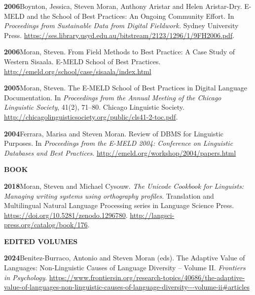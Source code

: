 \documentclass[11pt]{article}
\newcommand{\hangpara}{
 \setlength{\parindent}{0in} %
 \hangindent=0.42in %
}
\begin{document}
\vskip 6pt
\hangpara
{\bf 2006}\hspace{1ex}Boynton, Jessica, Steven Moran, Anthony Aristar and Helen Aristar-Dry. E-MELD and the School of Best Practices: An Ongoing Community Effort. In {\it Proceedings from Sustainable Data from Digital Fieldwork.} Sydney University Press. \url{https://ses.library.usyd.edu.au/bitstream/2123/1296/1/9FH2006.pdf}. %

\vskip 6pt
\hangpara
{\bf 2006}\hspace{1ex}Moran, Steven. From Field Methods to Best Practice: A Case Study of Western Sisaala. E-MELD School of Best Practices. \url{http://emeld.org/school/case/sisaala/index.html}

\vskip 6pt
\hangpara
{\bf 2005}\hspace{1ex}Moran, Steven. The E-MELD School of Best Practices in Digital Language Documentation. In {\it Proceedings from the Annual Meeting of the Chicago Linguistic Society}, 41(2), 71--80. Chicago Linguistic Society. \url{http://chicagolinguisticsociety.org/public/cls41-2-toc.pdf}.


\vskip 6pt
\hangpara
{\bf 2004}\hspace{1ex}Ferrara, Marisa and Steven Moran. Review of DBMS for Linguistic Purposes. In {\it Proceedings from the E-MELD 2004: Conference on Linguistic Databases and Best Practices}. \url{http://emeld.org/workshop/2004/papers.html}


\vskip 20pt
\begin{flushleft}
{\bf BOOK}
\end{flushleft}

\hangpara
{\bf 2018}\hspace{1ex}Moran, Steven and Michael Cysouw. {\it The Unicode Cookbook for Linguists: Managing writing systems using orthography profiles}. Translation and Multilingual Natural Language Processing series in Language Science Press. \url{https://doi.org/10.5281/zenodo.1296780}. \url{http://langsci-press.org/catalog/book/176}.


\vskip 20pt
\begin{flushleft}
{\bf EDITED VOLUMES}
\end{flushleft}

\hangpara
{\bf 2024}\hspace{1ex}Benitez-Burraco, Antonio and Steven Moran (eds). The Adaptive Value of Languages: Non-Linguistic Causes of Language Diversity -- Volume II. {\it Frontiers in Psychology}. \url{https://www.frontiersin.org/research-topics/40686/the-adaptive-value-of-languages-non-linguistic-causes-of-language-diversity---volume-ii#articles} %
\end{document}
